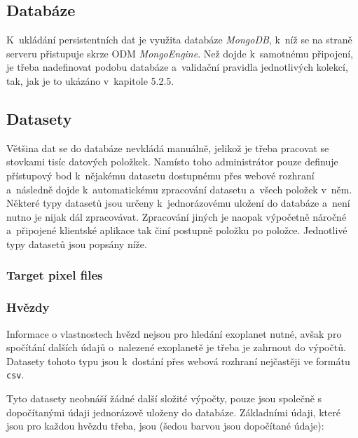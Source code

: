 \documentclass[a4paper,12pt]{article}
\def\code#1{\texttt{#1}}
\begin{document}
{{{{{{{{


\subsection{Databáze}

K~ukládání persistentních dat je využita databáze \textit{MongoDB}, k~níž se na straně serveru přistupuje skrze ODM \textit{MongoEngine}. Než dojde k~samotnému připojení, je třeba nadefinovat podobu databáze a~validační pravidla jednotlivých kolekcí, tak, jak je to ukázáno v~kapitole 5.2.5.



\subsection{Datasety}

Většina dat se do databáze nevkládá manuálně, jelikož je třeba pracovat se stovkami tisíc datových položkek. Namísto toho administrátor pouze definuje přístupový bod k~nějakému datasetu dostupnému přes webové rozhraní a~následně dojde k~automatickému zpracování datasetu a~všech položek v~něm. Některé typy datasetů jsou určeny k~jednorázovému uložení do databáze a~není nutno je nijak dál zpracovávat. Zpracování jiných je naopak výpočetně náročné a~připojené klientské aplikace tak činí postupně položku po položce. Jednotlivé typy datasetů jsou popsány níže.

\subsubsection{Target pixel files}

\subsubsection{Hvězdy}

Informace o vlastnostech hvězd nejsou pro hledání exoplanet nutné, avšak pro spočítání dalších údajů o~nalezené exoplanetě je třeba je zahrnout do výpočtů. Datasety tohoto typu jsou k~dostání přes webová rozhraní nejčastěji ve formátu \code{csv}.


Tyto datasety neobnáší žádné další složité výpočty, pouze jsou společně s dopočítanými údaji jednorázově uloženy do databáze. Základními údaji, které jsou pro každou hvězdu třeba, jsou (šedou barvou jsou dopočítané údaje):

}}}}}}}}
\end{document}
